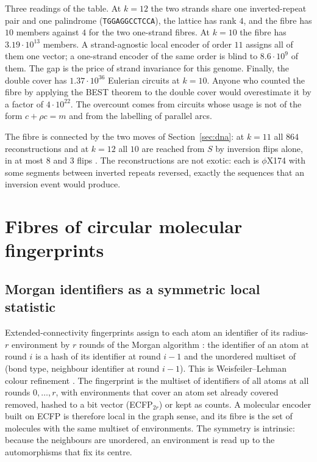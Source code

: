 \documentclass[11pt]{article}
\theoremstyle{plain}
\theoremstyle{definition}
\theoremstyle{remark}
\begin{document}
Three readings of the table. At $k=12$ the two strands share one inverted-repeat pair and one palindrome
(\texttt{TGGAGGCCTCCA}), the lattice has rank $4$, and the fibre has $10$ members against $4$ for the two
one-strand fibres. At $k=10$ the fibre has $3.19\cdot10^{13}$ members. A strand-agnostic local encoder of order
$11$ assigns all of them one vector; a one-strand encoder of the same order is blind to $8.6\cdot10^9$ of them. The
gap is the price of strand invariance for this genome. Finally, the double cover has $1.37\cdot10^{36}$ Eulerian
circuits at $k=10$. Anyone who counted the fibre by applying the BEST theorem to the double cover would
overestimate it by a factor of $4\cdot10^{22}$. The overcount comes from circuits whose usage is not of the form
$c+\rho c=m$ and from the labelling of parallel arcs.

The fibre is connected by the two moves of Section~\ref{sec:dna}: at $k=11$ all $864$ reconstructions and at
$k=12$ all $10$ are reached from $S$ by inversion flips alone, in at most $8$ and $3$ flips
\cite[Ch.~7, \texttt{ds\_flips}]{AG}. The reconstructions are not exotic: each is $\phi$X174 with some segments
between inverted repeats reversed, exactly the sequences that an inversion event would produce.

\section{Fibres of circular molecular fingerprints}\label{sec:ecfp}

\subsection{Morgan identifiers as a symmetric local statistic}

Extended-connectivity fingerprints \cite{RH10} assign to each atom an identifier of its radius-$r$ environment by
$r$ rounds of the Morgan algorithm \cite{Morgan65}: the identifier of an atom at round $i$ is a hash of its
identifier at round $i-1$ and the unordered multiset of (bond type, neighbour identifier at round $i-1$). This is
Weisfeiler--Lehman colour refinement \cite{WL68,GIN}. The fingerprint is the multiset of identifiers of all atoms at
all rounds $0,\dots,r$, with environments that cover an atom set already covered removed, hashed to a bit vector
(ECFP$_{2r}$) or kept as counts. A molecular encoder built on ECFP is therefore local in the graph sense, and its
fibre is the set of molecules with the same multiset of environments. The symmetry is intrinsic: because the
neighbours are unordered, an environment is read up to the automorphisms that fix its centre.
\end{document}
